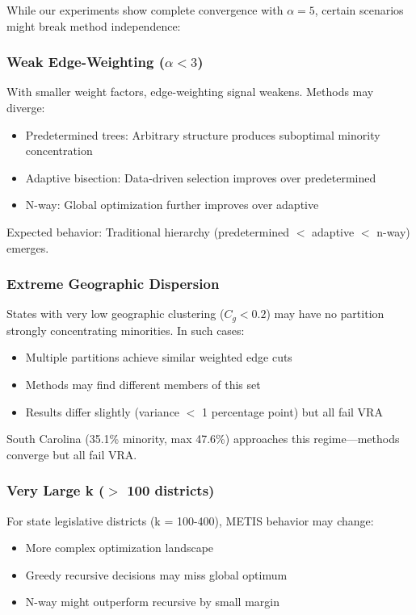 While our experiments show complete convergence with $\alpha = 5$, certain scenarios might break method independence:

\subsubsection{Weak Edge-Weighting ($\alpha < 3$)}

With smaller weight factors, edge-weighting signal weakens. Methods may diverge:
\begin{itemize}
\item Predetermined trees: Arbitrary structure produces suboptimal minority concentration
\item Adaptive bisection: Data-driven selection improves over predetermined
\item N-way: Global optimization further improves over adaptive
\end{itemize}

Expected behavior: Traditional hierarchy (predetermined $<$ adaptive $<$ n-way) emerges.

\subsubsection{Extreme Geographic Dispersion}

States with very low geographic clustering ($C_g < 0.2$) may have no partition strongly concentrating minorities. In such cases:
\begin{itemize}
\item Multiple partitions achieve similar weighted edge cuts
\item Methods may find different members of this set
\item Results differ slightly (variance $<$ 1 percentage point) but all fail VRA
\end{itemize}

South Carolina (35.1\% minority, max 47.6\%) approaches this regime—methods converge but all fail VRA.

\subsubsection{Very Large k ($>$ 100 districts)}

For state legislative districts (k = 100-400), METIS behavior may change:
\begin{itemize}
\item More complex optimization landscape
\item Greedy recursive decisions may miss global optimum
\item N-way might outperform recursive by small margin
\end{itemize}

